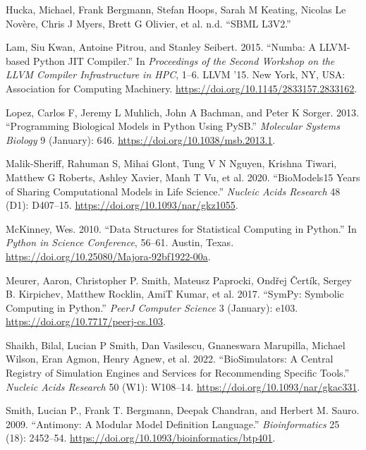 \documentclass[
  a4paper,
  DIV=11,
  numbers=noendperiod]{scrartcl}
\newlength{\cslhangindent}
\newlength{\cslentryspacingunit} %
\newenvironment{CSLReferences}[2] %
 {%
  \setlength{\parindent}{0pt}
  \ifodd #1
  \let\oldpar\par
  \def\par{\hangindent=\cslhangindent\oldpar}
  \fi
  \setlength{\parskip}{#2\cslentryspacingunit}
 }%
 {}
\begin{document}
\begin{CSLReferences}{1}{0}
\leavevmode{}%
Hucka, Michael, Frank Bergmann, Stefan Hoops, Sarah M Keating, Nicolas
Le Novère, Chris J Myers, Brett G Olivier, et al. n.d. {``{SBML
L3V2}.''}

\leavevmode{}%
Lam, Siu Kwan, Antoine Pitrou, and Stanley Seibert. 2015. {``Numba: A
{LLVM-based Python JIT} Compiler.''} In \emph{Proceedings of the {Second
Workshop} on the {LLVM Compiler Infrastructure} in {HPC}}, 1--6. {LLVM}
'15. {New York, NY, USA}: {Association for Computing Machinery}.
\url{https://doi.org/10.1145/2833157.2833162}.

\leavevmode{}%
Lopez, Carlos F, Jeremy L Muhlich, John A Bachman, and Peter K Sorger.
2013. {``Programming Biological Models in {Python} Using {PySB}.''}
\emph{Molecular Systems Biology} 9 (January): 646.
\url{https://doi.org/10.1038/msb.2013.1}.

\leavevmode{}%
Malik-Sheriff, Rahuman S, Mihai Glont, Tung V N Nguyen, Krishna Tiwari,
Matthew G Roberts, Ashley Xavier, Manh T Vu, et al. 2020.
{``{BioModels}{\textemdash}15 Years of Sharing Computational Models in
Life Science.''} \emph{Nucleic Acids Research} 48 (D1): D407--15.
\url{https://doi.org/10.1093/nar/gkz1055}.

\leavevmode{}%
McKinney, Wes. 2010. {``Data {Structures} for {Statistical Computing} in
{Python}.''} In \emph{Python in {Science Conference}}, 56--61. {Austin,
Texas}. \url{https://doi.org/10.25080/Majora-92bf1922-00a}.

\leavevmode{}%
Meurer, Aaron, Christopher P. Smith, Mateusz Paprocki, Ondřej Čertík,
Sergey B. Kirpichev, Matthew Rocklin, AmiT Kumar, et al. 2017.
{``{SymPy}: Symbolic Computing in {Python}.''} \emph{PeerJ Computer
Science} 3 (January): e103. \url{https://doi.org/10.7717/peerj-cs.103}.

\leavevmode{}%
Shaikh, Bilal, Lucian P Smith, Dan Vasilescu, Gnaneswara Marupilla,
Michael Wilson, Eran Agmon, Henry Agnew, et al. 2022.
{``{BioSimulators}: A Central Registry of Simulation Engines and
Services for Recommending Specific Tools.''} \emph{Nucleic Acids
Research} 50 (W1): W108--14. \url{https://doi.org/10.1093/nar/gkac331}.

\leavevmode{}%
Smith, Lucian P., Frank T. Bergmann, Deepak Chandran, and Herbert M.
Sauro. 2009. {``Antimony: A Modular Model Definition Language.''}
\emph{Bioinformatics} 25 (18): 2452--54.
\url{https://doi.org/10.1093/bioinformatics/btp401}.

\end{CSLReferences}
\end{document}

